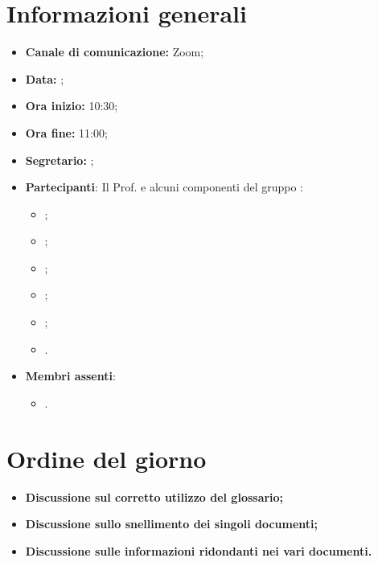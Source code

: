 \section{Informazioni generali}

\begin{itemize}

	\item \textbf{Canale di comunicazione:} Zoom;
	
	\item \textbf{Data:} \DataMeeting{};
	
	\item \textbf{Ora inizio:} 10:30;
	
	\item \textbf{Ora fine:} 11:00;
	
	\item \textbf{Segretario:} \Tommaso{};
	
	\item \textbf{Partecipanti}: Il Prof. \Tullio{} e alcuni componenti del gruppo \Gruppo{}:
	
		\begin{itemize}
			\item \Daniele{};
			\item \Davide{};
			\item \Francesco{};
			\item \Giosue{};
			\item \Lucrezia{};
			\item \Tommaso{}.
		\end{itemize}

	\item \textbf{Membri assenti}:
		\begin{itemize}
			\item \Matteo{}.
		\end{itemize}
	\end{itemize}
\section{Ordine del giorno}

\begin{itemize}
	\item\textbf{Discussione sul corretto utilizzo del glossario;}
	\item\textbf{Discussione sullo snellimento dei singoli documenti;}
	\item\textbf{Discussione sulle informazioni ridondanti nei vari documenti.}


\end{itemize}


